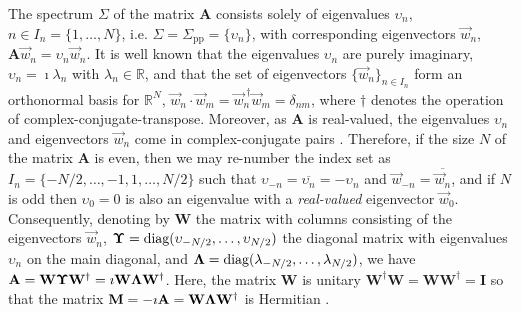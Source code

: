 \documentclass[11pt]{amsart}
\newcommand{\Sigp}{\Sigma_{\text{pp}}}
\newcommand{\Mb}{\mathbf{M}}
\newcommand{\Ib}{\mathbf{I}}
\newcommand{\Ab}{\mathbf{A}}
\newcommand{\Wb}{\mathbf{W}}
\newcommand\bUpsilon{\mbox{\boldmath${\Upsilon}$}}
\newcommand\bLambda{\mbox{\boldmath${\Lambda}$}}
\begin{document}
 
 The spectrum $\Sigma$ of the matrix $\Ab$ consists solely of 
 eigenvalues $\upsilon_n$, $n\in I_n=\{1,\ldots,N\}$, i.e. $\Sigma=\Sigp=\{\upsilon_n\}$, with
 corresponding eigenvectors  $\vec{w}_n$,
 $\Ab\vec{w}_n=\upsilon_n\vec{w}_n$. It is well known
 \cite{Horn_Johnson-1990} that the eigenvalues $\upsilon_n$ are purely 
imaginary, $\upsilon_n=\imath\lambda_n$ with $\lambda_n\in\mathbb{R}$, and that the set of
eigenvectors $\{\vec{w}_n\}_{n\in I_n}$ form an orthonormal basis
\cite{Keener-2000} for $\mathbb{R}^N$,
$\vec{w}_n\cdot\vec{w}_m=\vec{w}_n^{\;\dagger}\vec{w}_m=\delta_{nm}$, where $\dagger$ 
denotes the operation of complex-conjugate-transpose. Moreover, as 
$\Ab$ is real-valued, the eigenvalues $\upsilon_n$ and eigenvectors
$\vec{w}_n$ come in complex-conjugate pairs
\cite{Horn_Johnson-1990}. Therefore, if the size $N$ of the matrix
$\Ab$ is even, then we may re-number the index set as
$I_n=\{-N/2,\ldots,-1,1,\ldots ,N/2\}$ such that $\upsilon_{-n}=\overline{\upsilon_n}=-\upsilon_n$ and
$\vec{w}_{-n}=\overline{\vec{w}_n}$, and if $N$ is odd then $\upsilon_0=0$ is
also an eigenvalue with a \emph{real-valued} eigenvector
$\vec{w}_0$. Consequently, denoting by $\Wb$ the matrix with columns
consisting of the eigenvectors $\vec{w}_n$,
$\bUpsilon=\text{diag}(\upsilon_{-N/2},\ldots,\upsilon_{N/2})$ the diagonal matrix with
eigenvalues $\upsilon_n$ on the main diagonal, and
$\bLambda=\text{diag}(\lambda_{-N/2},\ldots,\lambda_{N/2})$, we have
$\Ab=\Wb\bUpsilon\Wb^\dagger=\imath\Wb\bLambda\Wb^\dagger$. Here, the matrix $\Wb$ is
unitary $\Wb^\dagger\Wb=\Wb\Wb^\dagger=\Ib$ so that the matrix
$\Mb=-\imath\Ab=\Wb\bLambda\Wb^\dagger$ is Hermitian 
\cite{Horn_Johnson-1990,Keener-2000}.  
\end{document}
